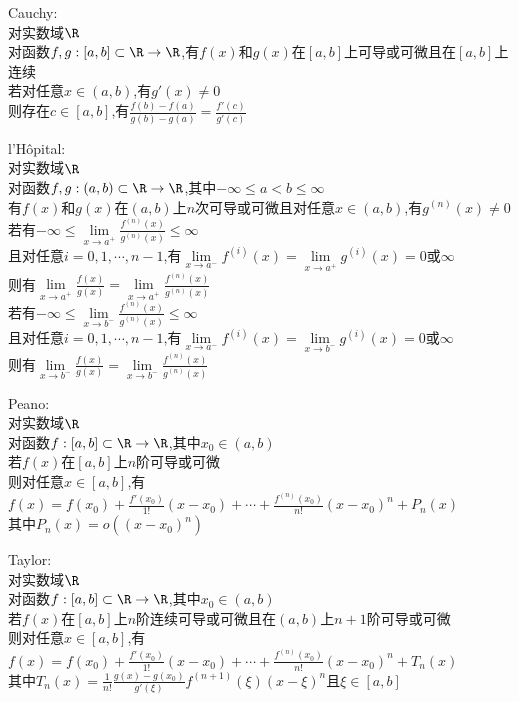 \begin{dingli}
Cauchy:\\
对实数域$\R$\\
对函数$f,g:[a,b]\subset \R \to \R$,有$f(x)$和$g(x)$在$[a,b]$上可导或可微且在$[a,b]$上连续\\
若对任意$x\in (a,b)$,有$g'(x)\neq 0$\\
则存在$c\in [a,b]$,有$\frac{f(b)-f(a)}{g(b)-g(a)}=\frac{f'(c)}{g'(c)}$
\end{dingli}

\begin{dingli}
l'Hôpital:\\
对实数域$\R$\\
对函数$f,g:(a,b)\subset \R \to \R$,其中$-\infty\leq a<b\leq \infty$\\
有$f(x)$和$g(x)$在$(a,b)$上$n$次可导或可微且对任意$x\in (a,b)$,有$g^{(n)}(x)\neq 0$\\
若有$-\infty\leq\lim\limits_{x\to a^{+}}\frac{f^{(n)}(x)}{g^{(n)}(x)}\leq \infty$\\
且对任意$i=0,1,\cdots,n-1$,有$\lim\limits_{x\to a^{-}}f^{(i)}(x)=\lim\limits_{x\to a^{+}}g^{(i)}(x)=0$或$\infty$\\
则有$\lim\limits_{x\to a^{+}}\frac{f(x)}{g(x)}=\lim\limits_{x\to a^{+}}\frac{f^{(n)}(x)}{g^{(n)}(x)}$\\
若有$-\infty\leq\lim\limits_{x\to b^{-}}\frac{f^{(n)}(x)}{g^{(n)}(x)}\leq \infty$\\
且对任意$i=0,1,\cdots,n-1$,有$\lim\limits_{x\to a^{-}}f^{(i)}(x)=\lim\limits_{x\to b^{-}}g^{(i)}(x)=0$或$\infty$\\
则有$\lim\limits_{x\to b^{-}}\frac{f(x)}{g(x)}=\lim\limits_{x\to b^{-}}\frac{f^{(n)}(x)}{g^{(n)}(x)}$
\end{dingli}

\begin{dingli}
Peano:\\
对实数域$\R$\\
对函数$f:[a,b]\subset \R \to \R$,其中$x_0\in (a,b)$\\
若$f(x)$在$[a,b]$上$n$阶可导或可微\\
则对任意$x\in [a,b]$,有$f(x)=f(x_0)+\frac{f'(x_0)}{1!}(x-x_0)+\cdots+\frac{f^{(n)}(x_0)}{n!}(x-x_0)^{n}+P_n(x)$\\
其中$P_n(x)=o((x-x_0)^n)$
\end{dingli}

\begin{dingli}
Taylor:\\
对实数域$\R$\\
对函数$f:[a,b]\subset \R \to \R$,其中$x_0\in (a,b)$\\
若$f(x)$在$[a,b]$上$n$阶连续可导或可微且在$(a,b)$上$n+1$阶可导或可微\\
则对任意$x\in [a,b]$,有$f(x)=f(x_0)+\frac{f'(x_0)}{1!}(x-x_0)+\cdots+\frac{f^{(n)}(x_0)}{n!}(x-x_0)^{n}+T_n(x)$\\
其中$T_n(x)=\frac{1}{n!}\frac{g(x)-g(x_0)}{g'(\xi)}f^{(n+1)}(\xi)(x-\xi)^{n}$且$\xi\in [a,b]$
\end{dingli}

